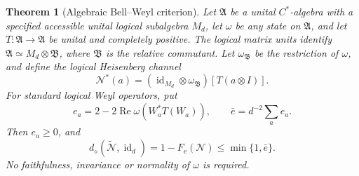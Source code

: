 \documentclass[11pt,reqno]{amsart}
\numberwithin{equation}{section}
\newtheorem{theorem}{Theorem}[section]
\theoremstyle{definition}
\theoremstyle{remark}
\newcommand{\id}{\operatorname{id}}
\newcommand{\Rea}{\operatorname{Re}}
\newcommand{\Ncal}{\mathcal N}
\newcommand{\Fe}{F_{\mathrm e}}
\newcommand{\diam}{d_\diamond}
\begin{document}
\begin{theorem}[Algebraic Bell--Weyl criterion]\label{thm:algebraic}
Let \(\mathfrak A\) be a unital \(C^*\)-algebra with a specified accessible
unital logical subalgebra \(M_d\), let \(\omega\) be any state on
\(\mathfrak A\), and let \(T:\mathfrak A\to\mathfrak A\) be unital
and completely positive.
The logical matrix units identify
\(\mathfrak A\simeq M_d\otimes\mathfrak B\), where
\(\mathfrak B\) is the relative commutant.
Let \(\omega_{\mathfrak B}\) be the restriction of \(\omega\), and define
the logical Heisenberg channel
\[
 \Ncal^*(a)=(\id_{M_d}\otimes\omega_{\mathfrak B})[T(a\otimes I)].
\]
For standard logical Weyl operators, put
\[
       e_a=2-2\Rea\omega(W_a^*T(W_a)),\qquad
       \bar e=d^{-2}\sum_a e_a.
\]
Then \(e_a\ge0\), and
\[
          \diam(\widetilde{\Ncal},\id_d)
                       =1-\Fe(\Ncal)\le\min\{1,\bar e\}.
\]
No faithfulness, invariance or normality of \(\omega\) is required.
\end{theorem}
\end{document}
